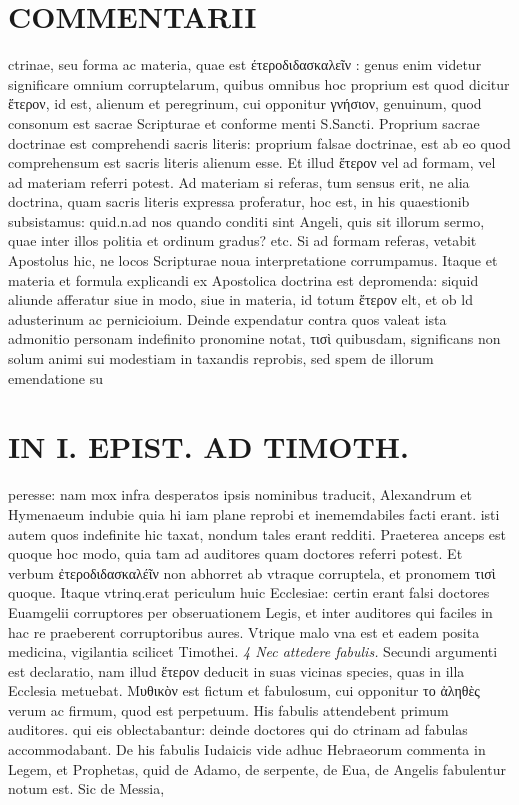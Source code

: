 \documentclass{article}
\begin{document}
\begin{pages}
\section*{COMMENTARII }
\marginpar{[ p.18 ]}\pstart ctrinae, seu forma ac materia, quae est έτεροδιδασκαλεῖν : genus enim videtur significare omnium corruptelarum, quibus omnibus hoc proprium est quod dicitur ἕτερον, id est, alienum et peregrinum, cui opponitur γνήσιον, genuinum, quod consonum est sacrae Scripturae et conforme menti S.Sancti. Proprium sacrae doctrinae est comprehendi sacris literis: proprium falsae doctrinae, est ab eo quod comprehensum est sacris literis alienum esse. Et illud ἕτερον vel ad formam, vel ad materiam referri potest. Ad materiam si referas, tum sensus erit, ne alia doctrina, quam sacris literis expressa proferatur, hoc est, in his quaestionib subsistamus: quid.n.ad nos quando conditi sint Angeli, quis sit illorum sermo, quae inter illos politia et ordinum gradus? etc. Si ad formam referas, vetabit Apostolus hic, ne locos Scripturae noua interpretatione corrumpamus. Itaque et materia et formula explicandi ex Apostolica doctrina est depromenda: siquid aliunde afferatur siue in modo, siue in materia, id totum ἕτερον elt, et ob ld adusterinum ac pernicioium.  \pend\pstart Deinde expendatur contra quos valeat ista admonitio personam indefinito pronomine notat, τισὶ quibusdam, significans non solum animi sui modestiam in taxandis reprobis, sed spem de illorum emendatione su\pend
\section*{IN I. EPIST. AD TIMOTH. }
\marginpar{[ p.19 ]}\pstart peresse: nam mox infra desperatos ipsis nominibus traducit, Alexandrum et Hymenaeum indubie quia hi iam plane reprobi et inememdabiles facti erant. isti autem quos indefinite hic taxat, nondum tales erant redditi. Praeterea anceps est quoque hoc modo, quia tam ad auditores quam doctores referri potest. Et verbum ἐτεροδιδασκαλέῖν non abhorret ab vtraque corruptela, et pronomem τισὶ quoque. Itaque vtrinq.erat periculum huic Ecclesiae: certin erant falsi doctores Euamgelii corruptores per obseruationem Legis, et inter auditores qui faciles in hac re praeberent corruptoribus aures. Vtrique malo vna est et eadem posita medicina, vigilantia scilicet Timothei.  \pend
\textit{4 Nec attedere fabulis. }\pstart Secundi argumenti est declaratio, nam illud ἕτερον deducit in suas vicinas species, quas in illa Ecclesia metuebat. Μυθικὸν est fictum et fabulosum, cui opponitur το ἀληθὲς verum ac firmum, quod est perpetuum. His fabulis attendebent primum auditores. qui eis oblectabantur: deinde doctores qui do ctrinam ad fabulas accommodabant. De his fabulis Iudaicis vide adhuc Hebraeorum commenta in Legem, et Prophetas, quid de Adamo, de serpente, de Eua, de Angelis fabulentur notum est. Sic de Messia,  \pend

\end{pages}
\end{document}
